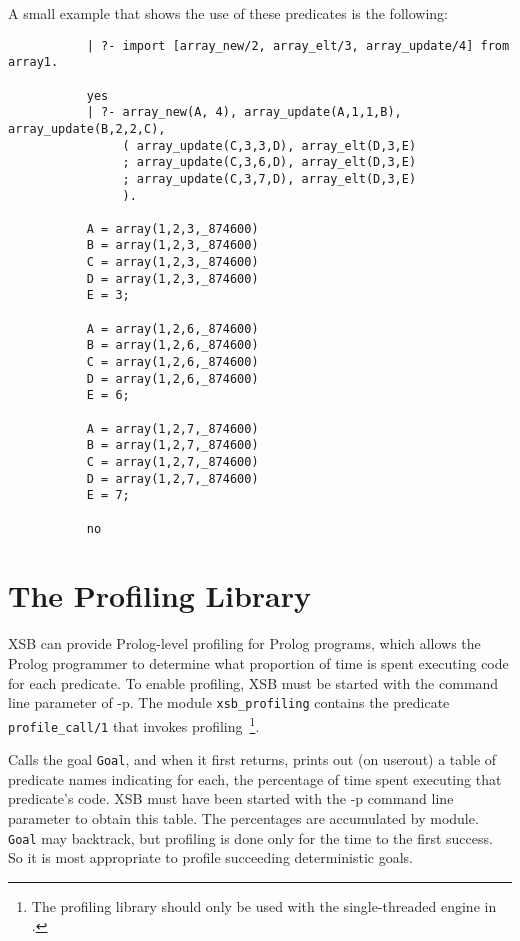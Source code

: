 A small example that shows the use of these predicates is the following:
{\footnotesize
 \begin{verbatim}
           | ?- import [array_new/2, array_elt/3, array_update/4] from array1.

           yes
           | ?- array_new(A, 4), array_update(A,1,1,B), array_update(B,2,2,C),
                ( array_update(C,3,3,D), array_elt(D,3,E)
                ; array_update(C,3,6,D), array_elt(D,3,E)
                ; array_update(C,3,7,D), array_elt(D,3,E)
                ).

           A = array(1,2,3,_874600)
           B = array(1,2,3,_874600)
           C = array(1,2,3,_874600)
           D = array(1,2,3,_874600)
           E = 3;

           A = array(1,2,6,_874600)
           B = array(1,2,6,_874600)
           C = array(1,2,6,_874600)
           D = array(1,2,6,_874600)
           E = 6;

           A = array(1,2,7,_874600)
           B = array(1,2,7,_874600)
           C = array(1,2,7,_874600)
           D = array(1,2,7,_874600)
           E = 7;

           no
 \end{verbatim}
}


\section{The Profiling Library} \label{sec:profile}

XSB can provide Prolog-level profiling for Prolog programs, which
allows the Prolog programmer to determine what proportion of time is
spent executing code for each predicate.  To enable profiling, XSB
must be started with the command line parameter of -p.  The module
{\tt xsb\_profiling} contains the predicate {\tt profile\_call/1} that
invokes profiling~\footnote{The profiling library should only be used
  with the single-threaded engine in \version{}.}.

\begin{description}

Calls the goal {\tt Goal}, and when it first returns, prints out (on
userout) a table of predicate names indicating for each, the
percentage of time spent executing that predicate's code.  XSB must
have been started with the -p command line parameter to obtain this
table.  The percentages are accumulated by module.  {\tt Goal} may
backtrack, but profiling is done only for the time to the first
success.  So it is most appropriate to profile succeeding
deterministic goals.
\end{description}

